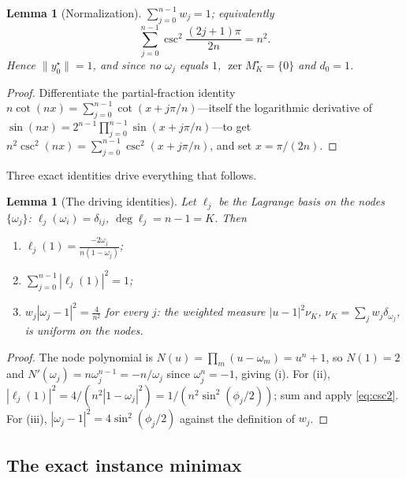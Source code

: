 \documentclass[11pt]{article}
\newtheorem{lemma}[theorem]{Lemma}
\theoremstyle{definition}
\theoremstyle{remark}
\DeclareMathOperator{\zer}{zer}
\newcommand{\norm}[1]{\| #1 \|}
\newcommand{\abs}[1]{| #1 |}
\begin{document}
\begin{lemma}[Normalization]\label{lem:csc2}
$\sum_{j=0}^{n-1}w_j=1$; equivalently
\begin{equation}\label{eq:csc2}
\sum_{j=0}^{n-1}\csc^2\frac{(2j+1)\pi}{2n}=n^2 .
\end{equation}
Hence $\norm{y_0^\star}=1$, and since no $\omega_j$ equals $1$,
$\zer M_K^\star=\{0\}$ and $d_0=1$.
\end{lemma}
\begin{proof}
Differentiate the partial-fraction identity
$n\cot(nx)=\sum_{j=0}^{n-1}\cot(x+j\pi/n)$---itself the logarithmic
derivative of $\sin(nx)=2^{n-1}\prod_{j=0}^{n-1}\sin(x+j\pi/n)$---to get
$n^2\csc^2(nx)=\sum_{j=0}^{n-1}\csc^2(x+j\pi/n)$, and set $x=\pi/(2n)$.
\end{proof}

Three exact identities drive everything that follows.

\begin{lemma}[The driving identities]\label{lem:identities}
Let $\ell_j$ be the Lagrange basis on the nodes $\{\omega_j\}$:
$\ell_j(\omega_i)=\delta_{ij}$, $\deg\ell_j=n-1=K$. Then
\begin{enumerate}[label=(\roman*)]
\item $\displaystyle \ell_j(1)=\frac{-2\omega_j}{n(1-\omega_j)}$;
\item $\displaystyle \sum_{j=0}^{n-1}\abs{\ell_j(1)}^2=1$;
\item $\displaystyle w_j\abs{\omega_j-1}^2=\frac4{n^2}$ for every $j$: the
      weighted measure $\abs{u-1}^2\nu_K$, $\nu_K=\sum_j w_j\delta_{\omega_j}$,
      is uniform on the nodes.
\end{enumerate}
\end{lemma}
\begin{proof}
The node polynomial is $N(u)=\prod_m(u-\omega_m)=u^n+1$, so $N(1)=2$ and
$N'(\omega_j)=n\omega_j^{n-1}=-n/\omega_j$ since $\omega_j^n=-1$, giving
(i). For (ii), $\abs{\ell_j(1)}^2=4/(n^2\abs{1-\omega_j}^2)
=1/(n^2\sin^2(\phi_j/2))$; sum and apply \eqref{eq:csc2}. For (iii),
$\abs{\omega_j-1}^2=4\sin^2(\phi_j/2)$ against the definition of $w_j$.
\end{proof}

\subsection{The exact instance minimax}
\end{document}
